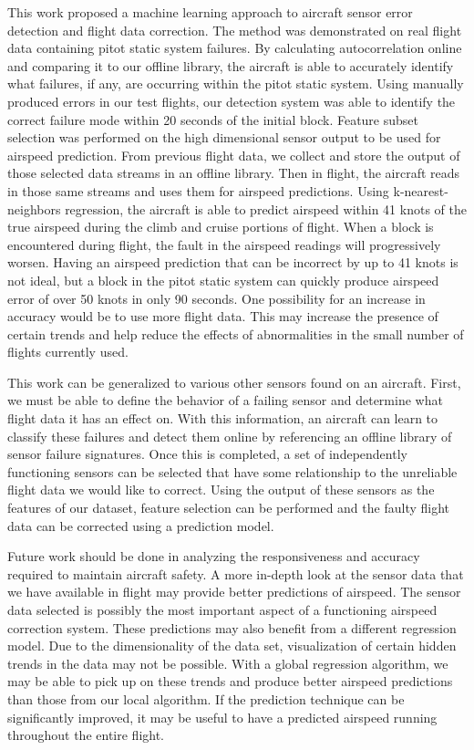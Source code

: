 \documentclass[]{aiaa-tc}
\begin{document}
This work proposed a machine learning approach to aircraft sensor error detection and flight data correction. The method was demonstrated on real flight data containing pitot static system failures. By calculating autocorrelation online and comparing it to our offline library, the aircraft is able to accurately identify what failures, if any, are occurring within the pitot static system. Using manually produced errors in our test flights, our detection system was able to identify the correct failure mode within 20 seconds of the initial block. Feature subset selection was performed on the high dimensional sensor output to be used for airspeed prediction. From previous flight data, we collect and store the output of those selected data streams in an offline library. Then in flight, the aircraft reads in those same streams and uses them for airspeed predictions. Using k-nearest-neighbors regression, the aircraft is able to predict airspeed within 41 knots of the true airspeed during the climb and cruise portions of flight. When a block is encountered during flight, the fault in the airspeed readings will progressively worsen. Having an airspeed prediction that can be incorrect by up to 41 knots is not ideal, but a block in the pitot static system can quickly produce airspeed error of over 50 knots in only 90 seconds. One possibility for an increase in accuracy would be to use more flight data. This may increase the presence of certain trends and help reduce the effects of abnormalities in the small number of flights currently used. 

This work can be generalized to various other sensors found on an aircraft. First, we must be able to define the behavior of a failing sensor and determine what flight data it has an effect on. With this information, an aircraft can learn to classify these failures and detect them online by referencing an offline library of sensor failure signatures. Once this is completed, a set of independently functioning sensors can be selected that have some relationship to the unreliable flight data we would like to correct. Using the output of these sensors as the features of our dataset, feature selection can be performed and the faulty flight data can be corrected using a prediction model. 

Future work should be done in analyzing the responsiveness and accuracy required to maintain aircraft safety. A more in-depth look at the sensor data that we have available in flight may provide better predictions of airspeed. The sensor data selected is possibly the most important aspect of a functioning airspeed correction system. These predictions may also benefit from a different regression model. Due to the dimensionality of the data set, visualization of certain hidden trends in the data may not be possible. With a global regression algorithm, we may be able to pick up on these trends and produce better airspeed predictions than those from our local algorithm. If the prediction technique can be significantly improved, it may be useful to have a predicted airspeed running throughout the entire flight. 
\end{document}

